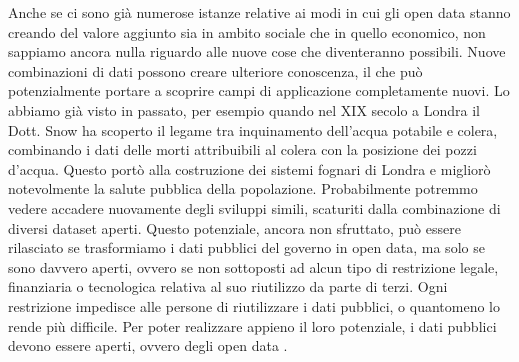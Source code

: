 Anche se ci sono già numerose istanze relative ai modi in cui gli open data stanno creando del valore aggiunto sia in ambito sociale che in quello economico, non sappiamo ancora nulla riguardo alle nuove cose che diventeranno possibili. Nuove combinazioni di dati possono creare ulteriore conoscenza, il che può potenzialmente portare a scoprire campi di applicazione completamente nuovi. Lo abbiamo già visto in passato, per esempio quando nel XIX secolo a Londra il Dott. Snow ha scoperto il legame tra inquinamento dell'acqua potabile e colera, combinando i dati delle morti attribuibili al colera con la posizione dei pozzi d'acqua. Questo portò alla costruzione dei sistemi fognari di Londra e migliorò notevolmente la salute pubblica della popolazione. Probabilmente potremmo vedere accadere nuovamente degli sviluppi simili, scaturiti dalla combinazione di diversi dataset aperti. Questo potenziale, ancora non sfruttato, può essere rilasciato se trasformiamo i dati pubblici del governo in open data, ma solo se sono davvero aperti, ovvero se non sottoposti ad alcun tipo di restrizione legale, finanziaria o tecnologica relativa al suo riutilizzo da parte di terzi. Ogni restrizione impedisce alle persone di riutilizzare i dati pubblici, o quantomeno lo rende più difficile. Per poter realizzare appieno il loro potenziale, i dati pubblici devono essere aperti, ovvero degli open data \cite{OpenDataHandbook_WhyOpenData}.






